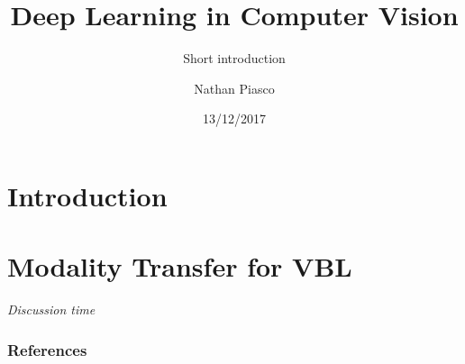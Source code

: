 \documentclass[9pt]{beamer}
\title[Deep Learning in Computer Vision]{Deep Learning in Computer Vision}
\subtitle{Short introduction}
\author{Nathan Piasco}
\institute{Le Creusot} %
\date{13/12/2017}
\begin{document}
\begin{frame}[plain,c]
	\titlepage
\end{frame}

\begin{frame}[plain,c]
	\tableofcontents
\end{frame}

\section{Introduction}

\section{Modality Transfer for VBL}




\begin{frame}[plain,c]
\centering
\vfill
\huge{\textit{Discussion time}}
\vfill
\end{frame}



\begin{frame}
\frametitle{References}


\scriptsize{}

\end{frame}

 
\end{document}
